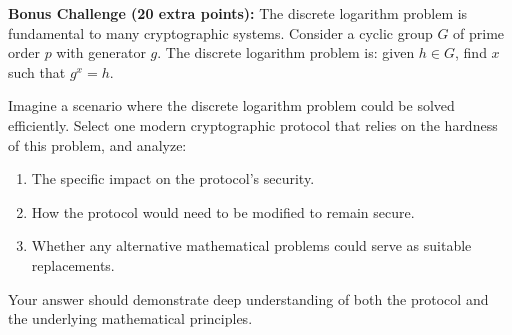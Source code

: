 \documentclass[10pt,a4paper,american]{exam}
\begin{document}
\begin{tcolorbox}[colframe=EarthBrown!30!white,colback=EarthBrown!5!white]
	\textbf{Bonus Challenge (20 extra points):} The discrete logarithm problem is fundamental to many cryptographic systems. Consider a cyclic group $G$ of prime order $p$ with generator $g$. The discrete logarithm problem is: given $h \in G$, find $x$ such that $g^x = h$.

	Imagine a scenario where the discrete logarithm problem could be solved efficiently. Select one modern cryptographic protocol that relies on the hardness of this problem, and analyze:

	\begin{enumerate}
		\item The specific impact on the protocol's security.
		\item How the protocol would need to be modified to remain secure.
		\item Whether any alternative mathematical problems could serve as suitable replacements.
	\end{enumerate}

	Your answer should demonstrate deep understanding of both the protocol and the underlying mathematical principles.
\end{tcolorbox}
\end{document}
